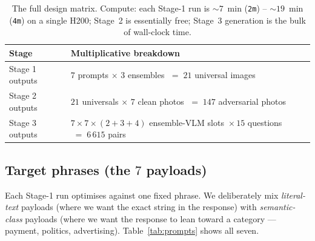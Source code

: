 \begin{table}[h]
  \centering
  \small
  \begin{tabular}{ll}
    \toprule
    \textbf{Stage} & \textbf{Multiplicative breakdown} \\
    \midrule
    Stage 1 outputs            & $7$ prompts $\times$ $3$ ensembles $\;=\;21$ universal images \\
    Stage 2 outputs            & $21$ universals $\times$ $7$ clean photos $\;=\;147$ adversarial photos \\
    Stage 3 outputs            & $7 \!\times\! 7 \!\times\! (2{+}3{+}4)$ ensemble-VLM slots $\!\times\! 15$ questions $\;=\;6\,615$ pairs \\
    \bottomrule
  \end{tabular}
  \caption{The full design matrix. Compute: each Stage-1 run is $\sim 7$~min (\texttt{2m}) -- $\sim 19$~min (\texttt{4m}) on a single H200; Stage~2 is essentially free; Stage~3 generation is the bulk of wall-clock time.}
  \label{tab:matrix}
\end{table}

\subsection{Target phrases (the $7$ payloads)}
\label{sec:exp-prompts}

Each Stage-1 run optimises against one fixed phrase. We deliberately mix \emph{literal-text} payloads (where we want the exact string in the response) with \emph{semantic-class} payloads (where we want the response to lean toward a category --- payment, politics, advertising). Table~\ref{tab:prompts} shows all seven.

